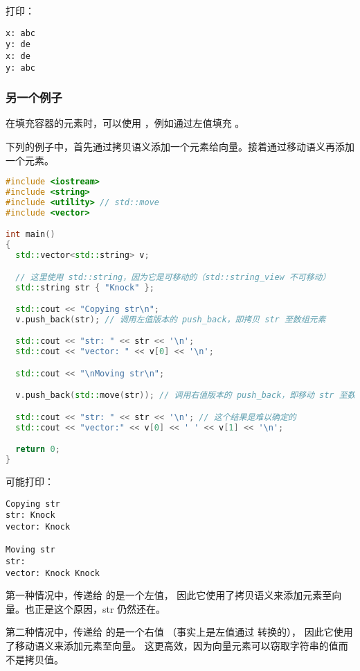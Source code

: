 \documentclass[../../LearnCpp.tex]{subfiles}
\begin{document}
打印：

\begin{lstlisting}
x: abc
y: de
x: de
y: abc
\end{lstlisting}

\subsubsection*{另一个例子}

在填充容器的元素时，可以使用 ，例如通过左值填充 。

下列的例子中，首先通过拷贝语义添加一个元素给向量。接着通过移动语义再添加一个元素。

\begin{lstlisting}[language=C++]
#include <iostream>
#include <string>
#include <utility> // std::move
#include <vector>

int main()
{
  std::vector<std::string> v;

  // 这里使用 std::string，因为它是可移动的（std::string_view 不可移动）
  std::string str { "Knock" };

  std::cout << "Copying str\n";
  v.push_back(str); // 调用左值版本的 push_back，即拷贝 str 至数组元素

  std::cout << "str: " << str << '\n';
  std::cout << "vector: " << v[0] << '\n';

  std::cout << "\nMoving str\n";

  v.push_back(std::move(str)); // 调用右值版本的 push_back，即移动 str 至数组元素

  std::cout << "str: " << str << '\n'; // 这个结果是难以确定的
  std::cout << "vector:" << v[0] << ' ' << v[1] << '\n';

  return 0;
}
\end{lstlisting}

可能打印：

\begin{lstlisting}
Copying str
str: Knock
vector: Knock

Moving str
str:
vector: Knock Knock
\end{lstlisting}

第一种情况中，传递给  的是一个左值，
因此它使用了拷贝语义来添加元素至向量。也正是这个原因，str 仍然还在。

第二种情况中，传递给  的是一个右值
（事实上是左值通过  转换的），
因此它使用了移动语义来添加元素至向量。
这更高效，因为向量元素可以窃取字符串的值而不是拷贝值。
\end{document}
